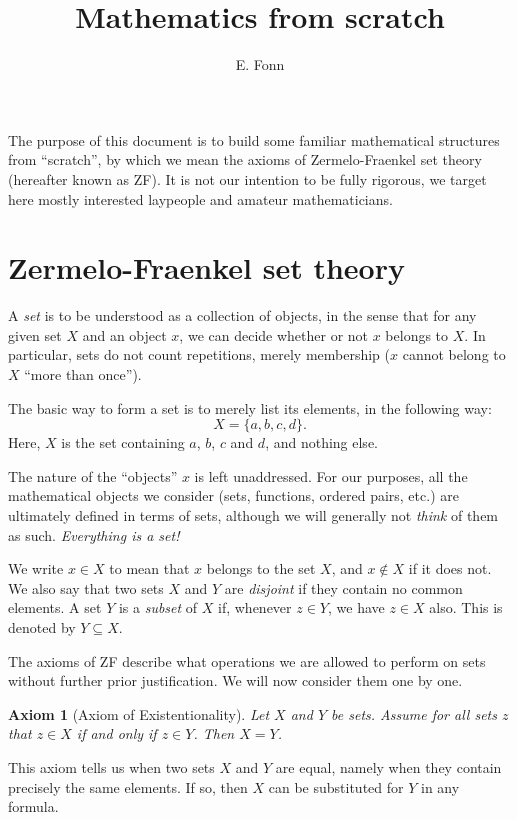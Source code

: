 \documentclass[a4paper, twoside, notitlepage, 11pt]{article}
\title{Mathematics from scratch}
\author{E. Fonn}
\theoremstyle{plain}
\newtheorem{ax}[prop]{Axiom}
\theoremstyle{definition}
\theoremstyle{remark}
\numberwithin{equation}{section}
\begin{document}
\maketitle

The purpose of this document is to build some familiar mathematical structures from ``scratch'', by which we
mean the axioms of Zermelo-Fraenkel set theory (hereafter known as ZF). It is not our intention to be fully
rigorous, we target here mostly interested laypeople and amateur mathematicians.

\section{Zermelo-Fraenkel set theory}

A {\em set} is to be understood as a collection of objects, in the sense that for any given set $X$ and an
object $x$, we can decide whether or not $x$ belongs to $X$. In particular, sets do not count repetitions,
merely membership ($x$ cannot belong to $X$ ``more than once'').

The basic way to form a set is to merely list its elements, in the following way:
\[
    X = \{a,b,c,d\}.
\]
Here, $X$ is the set containing $a$, $b$, $c$ and $d$, and nothing else.

The nature of the ``objects'' $x$ is left unaddressed. For our purposes, all the mathematical objects we
consider (sets, functions, ordered pairs, etc.) are ultimately defined in terms of sets, although we will
generally not {\em think} of them as such. {\em Everything is a set!}

We write $x \in X$ to mean that $x$ belongs to the set $X$, and $x \not\in X$ if it does not. We also say that
two sets $X$ and $Y$ are {\em disjoint} if they contain no common elements. A set $Y$ is a {\em subset} of $X$
if, whenever $z \in Y$, we have $z \in X$ also. This is denoted by $Y \subseteq X$.

The axioms of ZF describe what operations we are allowed to perform on sets without further prior
justification. We will now consider them one by one.

\begin{ax}[Axiom of Existentionality] \label{ax:ex}
Let $X$ and $Y$ be sets. Assume for all sets $z$ that $z \in X$ if and only if $z \in Y$. Then $X=Y$.
\end{ax}

This axiom tells us when two sets $X$ and $Y$ are equal, namely when they contain precisely the same elements.
If so, then $X$ can be substituted for $Y$ in any formula.
\end{document}
